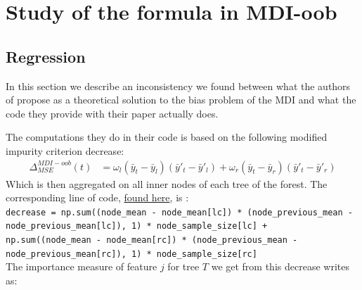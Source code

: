 \documentclass{article}
\begin{document}


\section{Study of the formula in MDI-oob}
\subsection{Regression}
In this section we describe an inconsistency we found between what the authors of \cite{MDI-oob} propose as a theoretical solution to the bias problem of the MDI and what the code they provide with their paper actually does.

The computations they do in their code is based on the following modified impurity criterion decrease:
\begin{align*}
    \Delta_{MSE}^{MDI-oob}(t) &= \omega_l (\bar{y}_t - \bar{y}_l)(\bar{y}'_t - \bar{y}'_l) + \omega_r (\bar{y}_t - \bar{y}_r)(\bar{y}'_t - \bar{y}'_r) 
\end{align*}
Which is then aggregated on all inner nodes of each tree of the forest. The corresponding line of code, \hyperlink{https://github.com/shifwang/paper-debiased-feature-importance/blob/master/simulations/02_comparison.ipynb}{found here}, is : 
\\  
\texttt{decrease = np.sum((node\_mean - node\_mean[lc]) * (node\_previous\_mean - node\_previous\_mean[lc]), 1) * node\_sample\_size[lc] + \\ np.sum((node\_mean - node\_mean[rc]) * (node\_previous\_mean - node\_previous\_mean[rc]), 1) * node\_sample\_size[rc]}
\\

The importance measure of feature $j$ for tree $T$ we get from this decrease writes as:
\end{document}
